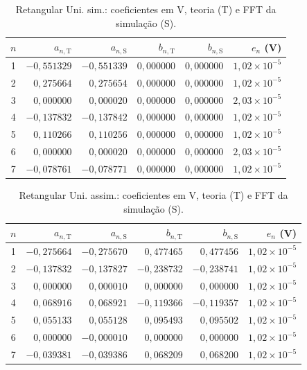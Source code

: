 \begin{table}[H]
\centering
\footnotesize\setlength{\tabcolsep}{2pt}
\caption{Retangular Uni. sim.: coeficientes em V, teoria (T) e FFT da simulação (S).}\label{tab:coef_comp19}
\begin{tabular}{crrrrr}\hline
$n$ & $a_{n,\mathrm T}$ & $a_{n,\mathrm S}$ & $b_{n,\mathrm T}$ & $b_{n,\mathrm S}$ & $e_n$ (V) \\ \hline
1 & $-0{,}551329$ & $-0{,}551339$ & $0{,}000000$ & $0{,}000000$ & $1{,}02\!\times\!10^{-5}$ \\
2 & $0{,}275664$ & $0{,}275654$ & $0{,}000000$ & $0{,}000000$ & $1{,}02\!\times\!10^{-5}$ \\
3 & $0{,}000000$ & $0{,}000020$ & $0{,}000000$ & $0{,}000000$ & $2{,}03\!\times\!10^{-5}$ \\
4 & $-0{,}137832$ & $-0{,}137842$ & $0{,}000000$ & $0{,}000000$ & $1{,}02\!\times\!10^{-5}$ \\
5 & $0{,}110266$ & $0{,}110256$ & $0{,}000000$ & $0{,}000000$ & $1{,}02\!\times\!10^{-5}$ \\
6 & $0{,}000000$ & $0{,}000020$ & $0{,}000000$ & $0{,}000000$ & $2{,}03\!\times\!10^{-5}$ \\
7 & $-0{,}078761$ & $-0{,}078771$ & $0{,}000000$ & $0{,}000000$ & $1{,}02\!\times\!10^{-5}$ \\
\hline\end{tabular}
\end{table}
\begin{table}[H]
\centering
\footnotesize\setlength{\tabcolsep}{2pt}
\caption{Retangular Uni. assim.: coeficientes em V, teoria (T) e FFT da simulação (S).}\label{tab:coef_comp20}
\begin{tabular}{crrrrr}\hline
$n$ & $a_{n,\mathrm T}$ & $a_{n,\mathrm S}$ & $b_{n,\mathrm T}$ & $b_{n,\mathrm S}$ & $e_n$ (V) \\ \hline
1 & $-0{,}275664$ & $-0{,}275670$ & $0{,}477465$ & $0{,}477456$ & $1{,}02\!\times\!10^{-5}$ \\
2 & $-0{,}137832$ & $-0{,}137827$ & $-0{,}238732$ & $-0{,}238741$ & $1{,}02\!\times\!10^{-5}$ \\
3 & $0{,}000000$ & $0{,}000010$ & $0{,}000000$ & $0{,}000000$ & $1{,}02\!\times\!10^{-5}$ \\
4 & $0{,}068916$ & $0{,}068921$ & $-0{,}119366$ & $-0{,}119357$ & $1{,}02\!\times\!10^{-5}$ \\
5 & $0{,}055133$ & $0{,}055128$ & $0{,}095493$ & $0{,}095502$ & $1{,}02\!\times\!10^{-5}$ \\
6 & $0{,}000000$ & $-0{,}000010$ & $0{,}000000$ & $0{,}000000$ & $1{,}02\!\times\!10^{-5}$ \\
7 & $-0{,}039381$ & $-0{,}039386$ & $0{,}068209$ & $0{,}068200$ & $1{,}02\!\times\!10^{-5}$ \\
\hline\end{tabular}
\end{table}
